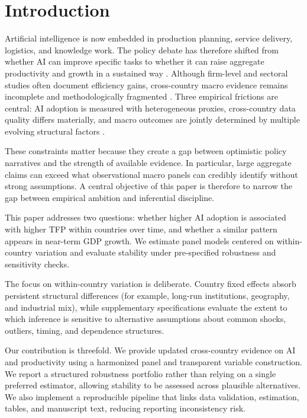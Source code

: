 \section{Introduction}

Artificial intelligence is now embedded in production planning, service delivery, logistics, and knowledge work. The policy debate has therefore shifted from whether AI can improve specific tasks to whether it can raise aggregate productivity and growth in a sustained way \cite{bresnahanTrajtenberg1995,cominMestieri2018}. Although firm-level and sectoral studies often document efficiency gains, cross-country macro evidence remains incomplete and methodologically fragmented \cite{brynjolfssonRockSyverson2019,noyZhang2023,brynjolfssonLiRaymond2023}. Three empirical frictions are central: AI adoption is measured with heterogeneous proxies, cross-country data quality differs materially, and macro outcomes are jointly determined by multiple evolving structural factors \cite{imf2024,oecd2023ai,goldfarbTucker2019}.

These constraints matter because they create a gap between optimistic policy narratives and the strength of available evidence. In particular, large aggregate claims can exceed what observational macro panels can credibly identify without strong assumptions. A central objective of this paper is therefore to narrow the gap between empirical ambition and inferential discipline.

This paper addresses two questions: whether higher AI adoption is associated with higher TFP within countries over time, and whether a similar pattern appears in near-term GDP growth. We estimate panel models centered on within-country variation and evaluate stability under pre-specified robustness and sensitivity checks.

The focus on within-country variation is deliberate. Country fixed effects absorb persistent structural differences (for example, long-run institutions, geography, and industrial mix), while supplementary specifications evaluate the extent to which inference is sensitive to alternative assumptions about common shocks, outliers, timing, and dependence structures.

Our contribution is threefold. We provide updated cross-country evidence on AI and productivity using a harmonized panel and transparent variable construction. We report a structured robustness portfolio rather than relying on a single preferred estimator, allowing stability to be assessed across plausible alternatives. We also implement a reproducible pipeline that links data validation, estimation, tables, and manuscript text, reducing reporting inconsistency risk.

